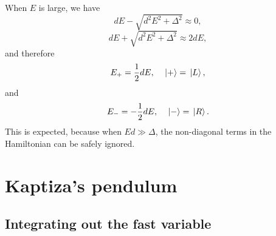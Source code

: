 \documentclass[hyperref, a4paper]{article}
\begin{document}
When $E$ is large, 
we have 
\[
    d E - \sqrt{d^2 E^2 + \Delta^2} \approx 0, 
\]
\[
    d E + \sqrt{d^2 E^2 + \Delta^2} \approx 2 d E,   
\]
and therefore 
\begin{equation}
    E_+ = \frac{1}{2} d E, \quad 
    \ket*{+} = \ket*{L},
\end{equation}
and 
\begin{equation}
    E_- = - \frac{1}{2} d E, \quad 
    \ket*{-} = \ket*{R}.
\end{equation}
This is expected, because when $E d\gg \Delta$, 
the non-diagonal terms in the Hamiltonian can be safely ignored. 

\section{Kaptiza’s pendulum}

\subsection{Integrating out the fast variable}
\end{document}
